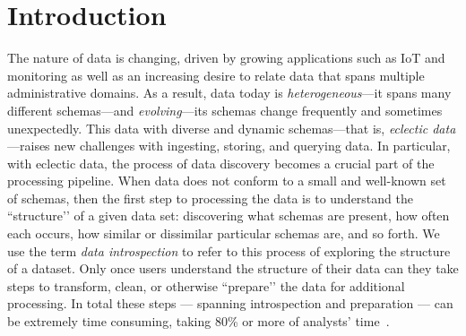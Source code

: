\vspace{-1em}
\section{Introduction}

The nature of data is changing, driven by growing applications such as IoT and monitoring as well as an increasing desire to relate data that spans multiple administrative domains. As a result, data today is {\em heterogeneous}---it spans many different schemas---and {\em evolving}---its schemas change frequently and sometimes unexpectedly. This data with diverse and dynamic schemas---that is, {\em eclectic data}---raises new challenges with ingesting, storing, and querying data. 
In particular, with eclectic data, the process of data discovery becomes a crucial part of the processing pipeline. When data does not conform to a small and well-known set of schemas, then the first step to processing the data is to understand the ``structure’’ of a given data set: discovering what schemas are present, how often each occurs, how similar or dissimilar particular schemas are, and so forth. We use the term {\em data introspection} to refer to this process of exploring the structure of a dataset. Only once users understand the structure of their data can they take steps to transform, clean, or otherwise ``prepare’’ the data for additional processing. In total these steps —  spanning introspection and preparation — can be extremely time consuming, taking 80\% or more of analysts' time~\cite{civilizer}. 


